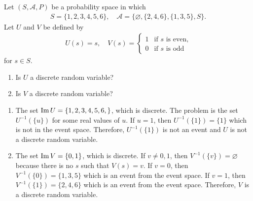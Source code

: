 \vspace*{16pt}

\begin{example}
Let $(S , \mathcal{A} , P)$ be a probability space in which
    \begin{align*}
    S = \{ 1 , 2, 3, 4, 5, 6 \}, \quad \mathcal{A} = \{ \varnothing , \{ 2, 4, 6\} , \{1, 3, 5\} , S \} .
    \end{align*} 
Let $U$ and $V$ be defined by
    \begin{align*}
    U (s) = s , \quad V(s) = \left\{ \begin{matrix} 1 & \text{if } s \text{ is even,} \\ 0 & \text{if } s \text{ is odd} \end{matrix} \right.
    \end{align*}
for $s \in S$. 
\begin{enumerate}[label=\alph*)]
    \item Is $U$ a discrete random variable?
    \item Is $V$ a discrete random variable?
\end{enumerate}
\end{example}

\begin{sol*}
\begin{enumerate}[label=\alph*)]
\item The set $\operatorname{Im} U = \{ 1 , 2, 3, 4, 5, 6, \}$, which is discrete. The problem is the set $U^{-1} (\{ u \})$ for some real values of $u$. If $u = 1$, then $U^{-1} (\{ 1 \} ) = \{ 1 \}$ which is not in the event space. Therefore, $U^{-1} (\{ 1 \})$ is not an event and $U$ is not a discrete random variable.
\item The set $\operatorname{Im} V = \{ 0 , 1 \}$, which is discrete. If $v \neq 0, 1$, then $V^{-1} (\{ v \}) = \varnothing$ because there is no $s$ such that $V (s) = v$. If $v = 0$, then $V^{-1} (\{ 0 \}) = \{ 1 ,3, 5 \}$ which is an event from the event space. If $v = 1$, then $V^{-1} (\{ 1\}) = \{ 2, 4, 6 \}$ which is an event from the event space. Therefore, $V$ is a discrete random variable.
\end{enumerate}
\end{sol*}


\vspace*{16pt}

